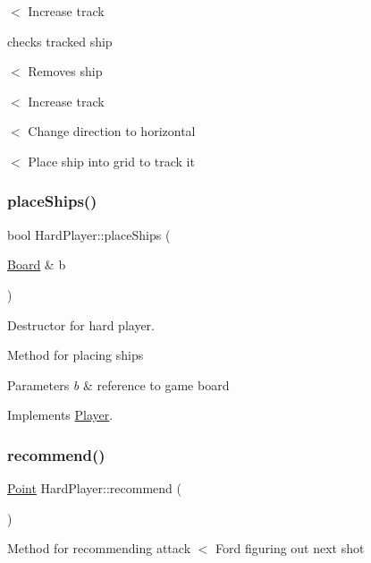 $<$ Increase track

checks tracked ship

$<$ Removes ship

$<$ Increase track

$<$ Change direction to horizontal

$<$ Place ship into grid to track it \mbox{\label{class_hard_player_a27d0ad3353eba585d7a93d2092036f98}} 
\subsubsection{\texorpdfstring{place\+Ships()}{placeShips()}}
{\footnotesize\ttfamily bool Hard\+Player\+::place\+Ships (\begin{DoxyParamCaption}\item[{\mbox{\hyperlink{class_board}{Board}} \&}]{b }\end{DoxyParamCaption})\hspace{0.3cm}{\ttfamily [virtual]}}



Destructor for hard player. 

Method for placing ships 
\begin{DoxyParams}{Parameters}
{\em b} & reference to game board \\
\hline
\end{DoxyParams}


Implements \mbox{\hyperlink{class_player_ab89c1180c7314d3e19bcf4b2bed2e02a}{Player}}.

\mbox{\label{class_hard_player_ae1d21325a648a88f1bf51f2b0b286190}} 
\subsubsection{\texorpdfstring{recommend()}{recommend()}}
{\footnotesize\ttfamily \mbox{\hyperlink{class_point}{Point}} Hard\+Player\+::recommend (\begin{DoxyParamCaption}{ }\end{DoxyParamCaption})\hspace{0.3cm}{\ttfamily [virtual]}}

Method for recommending attack $<$ Ford figuring out next shot

